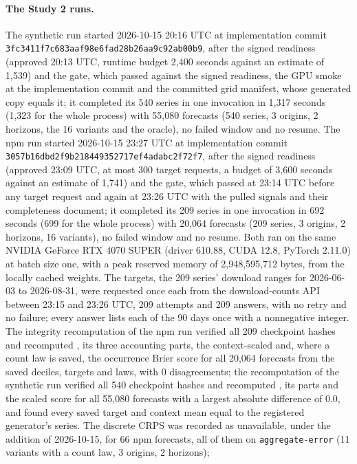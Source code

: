 \paragraph{The Study 2 runs.} The synthetic run started 2026-10-15 20:16 UTC at implementation commit
\texttt{3fc3411f7c683aaf98e6fad28b26aa9c92ab00b9}, after the signed readiness (approved 20:13 UTC, runtime
budget 2,400 seconds against an estimate of 1,539) and the gate, which passed against the signed readiness,
the GPU smoke at the implementation commit and the committed grid manifest, whose generated copy equals it;
it completed its 540 series in one invocation in 1,317 seconds (1,323 for the whole process) with 55,080
forecasts (540 series, 3 origins, 2 horizons, the 16 variants and the oracle), no failed window and no
resume. The npm run started 2026-10-15 23:27 UTC at implementation commit
\texttt{3057b16dbd2f9b218449352717ef4adabc2f72f7}, after the signed readiness (approved 23:09 UTC, at most
300 target requests, a budget of 3,600 seconds against an estimate of 1,741) and the gate, which passed at
23:14 UTC before any target request and again at 23:26 UTC with the pulled signals and their completeness
document; it completed its 209 series in one invocation in 692 seconds (699 for the whole process) with
20,064 forecasts (209 series, 3 origins, 2 horizons, 16 variants), no failed window and no resume. Both ran
on the same NVIDIA GeForce RTX 4070 SUPER (driver 610.88, CUDA 12.8, PyTorch 2.11.0) at batch size one,
with a peak reserved memory of 2,948,595,712 bytes, from the locally cached weights. The targets, the 209
series' download ranges for 2026-06-03 to 2026-08-31, were requested once each from the download-counts API
between 23:15 and 23:26 UTC, 209 attempts and 209 answers, with no retry and no failure; every answer lists
each of the 90 days once with a nonnegative integer. The integrity recomputation of the npm run verified all
209 checkpoint hashes and recomputed \qs{}, its three accounting parts, the context-scaled \qs{} and, where
a count law is saved, the occurrence Brier score for all 20,064 forecasts from the saved deciles, targets
and laws, with 0 disagreements; the recomputation of the synthetic run verified all 540 checkpoint hashes
and recomputed \qs{}, its parts and the scaled score for all 55,080 forecasts with a largest absolute
difference of 0.0, and found every saved target and context mean equal to the registered generator's
series. The discrete CRPS was recorded as unavailable, under the addition of 2026-10-15, for 66 npm
forecasts, all of them on \texttt{aggregate-error} (11 variants with a count law, 3 origins, 2 horizons);
